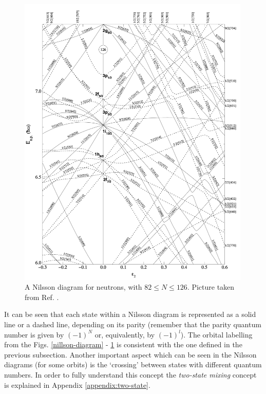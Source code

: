 \begin{figure}
    \centering
    \includegraphics[width=0.99\textwidth]{Chapters/Figures/nillson_diagram_2.png}
    \caption{A Nilsson diagram for neutrons, with $82\leq N\leq126$. Picture taken from Ref. \cite{ragnarsson2005shapes}.}
    \label{nillson-diagram-2}
\end{figure}

It can be seen that each state within a Nilsson diagram is represented as a solid line or a dashed line, depending on its parity (remember that the parity quantum number is given by $(-1)^N$ or, equivalently, by $(-1)^l$). The orbital labelling from the Figs. \ref{nillson-diagram} - \ref{nillson-diagram-2} is consistent with the one defined in the previous subsection. Another important aspect which can be seen in the Nilsson diagrams (for some orbits) is the `crossing' between states with different quantum numbers. In order to fully understand this concept the \emph{two-state mixing} concept is explained in Appendix \ref{appendix:two-state}.

